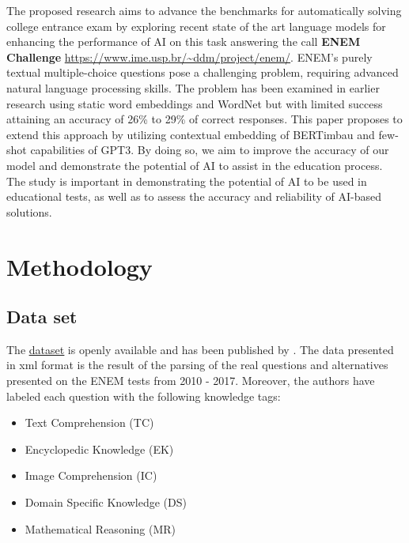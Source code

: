\documentclass{article}
\begin{document}
The proposed research aims to advance the benchmarks for automatically solving college entrance exam by exploring recent state of the art language models for enhancing the performance of AI on this task answering the call \textbf{ENEM Challenge}  \url{https://www.ime.usp.br/~ddm/project/enem/}. ENEM's purely textual multiple-choice questions pose a challenging problem, requiring advanced natural language processing skills. The problem has been examined in earlier research \cite{8575587} using static word embeddings and WordNet but with limited success attaining an accuracy of 26\% to 29\% of correct responses. This paper proposes to extend this approach by utilizing contextual embedding of BERTimbau and few-shot capabilities of GPT3. By doing so, we aim to improve the accuracy of our model and demonstrate the potential of AI to assist in the education process. The study is important in demonstrating the potential of AI to be used in educational tests, as well as to assess the accuracy and reliability of AI-based solutions. 



\section{Methodology}

\subsection{Data set}

The \href{https://www.ime.usp.br/~ddm/project/enem/ENEMdataset.zip}{\underline{dataset}} is openly available and has been published by \cite{DBLP:journals/corr/abs-2201-11903}. The data presented in xml format is the result of the parsing of the real questions and alternatives presented on the ENEM tests from 2010 - 2017. Moreover, the authors have labeled each question with the following knowledge tags:

\vspace{-0.15cm}
\begin{itemize}%
  \item Text Comprehension (TC)
  \vspace{-0.25cm}
  \item Encyclopedic Knowledge (EK)
  \vspace{-0.25cm}
  \item Image Comprehension (IC)
  \vspace{-0.25cm}
  \item Domain Speciﬁc Knowledge (DS)
  \vspace{-0.25cm}
  \item Mathematical Reasoning (MR)
\end{itemize}
\vspace{-0.05cm}
\end{document}
